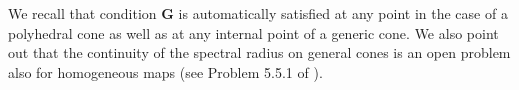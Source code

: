 \documentclass{article}
\begin{document}
%
We recall that condition \textbf{G} is automatically satisfied at any point in the case of a polyhedral cone as well as at any internal point of a generic cone.
We also point out that the continuity of the spectral radius on general cones is an open problem also for homogeneous maps (see Problem 5.5.1 of \cite{lemmens2012nonlinear}).
\end{document}
